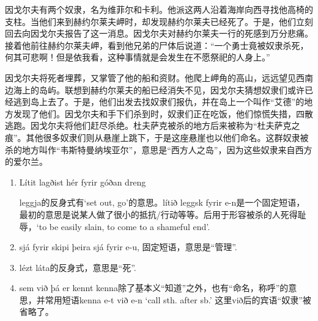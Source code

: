 \begin{translation*}{}
    因戈尔夫有两个奴隶，名为维菲尔和卡利。他派这两人沿着海岸向西寻找他高椅的支柱。当他们来到赫约尔莱夫岬时，却发现赫约尔莱夫已经死了。于是，他们立刻回去向因戈尔夫报告了这一消息。因戈尔夫对赫约尔莱夫一行的死感到万分悲痛。接着他前往赫约尔莱夫岬，看到他兄弟的尸体后说道：“一个勇士竟被奴隶杀死，何其可悲啊！但是依我看，这种事情就是会发生在不愿祭祀的人身上。”

    因戈尔夫将死者埋葬，又掌管了他的船和资财。他爬上岬角的高山，远远望见西南边海上的岛屿。联想到赫约尔莱夫的船已经消失不见，因戈尔夫猜想奴隶们或许已经逃到岛上去了。于是，他们出发去找奴隶们报仇，并在岛上一个叫作“艾德”的地方发现了他们。因戈尔夫和手下们杀到时，奴隶们正在吃饭，他们惊慌失措，四散逃跑。因戈尔夫将他们赶尽杀绝。杜夫萨克被杀的地方后来被称为“杜夫萨克之痕”。其他很多奴隶们则从悬崖上跳下，于是这座悬崖也以他们命名。这群奴隶被杀的地方叫作“韦斯特曼纳埃亚尔”，意思是“西方人之岛”，因为这些奴隶来自西方的爱尔兰。
\end{translation*}
\begin{grammar*}{}
    \begin{enumerate}[leftmargin=*]
        \item Lítit lagðist hér fyrir góðan dreng

              leggja的反身式有`set out, go'的意思。lítið leggsk fyrir e-n是一个固定短语，最初的意思是说某人做了很小的抵抗/行动等等。后用于形容被杀的人死得耻辱，`to be easily slain, to come to a shameful end'.
        \item sjá fyrir skipi þeira
              sjá fyrir e-u, 固定短语，意思是“管理”.
        \item lézt
              láta的反身式，意思是“死”.
        \item sem við þá er kennt
              kenna除了基本义“知道”之外，也有“命名，称呼”的意思，并常用短语kenna e-t við e-n `call sth. after sb.' 这里við后的宾语“奴隶”被省略了。
    \end{enumerate}
\end{grammar*}

